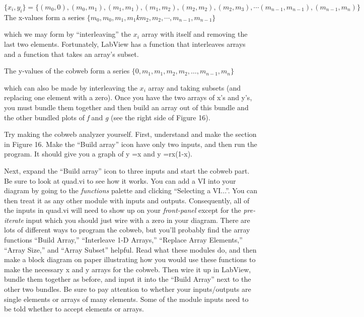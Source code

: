\documentclass{../lab}
\begin{document}
\begin{equation}
    \{x_i,y_i\}=\{(m_0,0),(m_0,m_1),(m_1,m_1),(m_1,m_2),(m_2,m_2),(m_2,m_3),\cdots (m_{n-1},m_{n-1}),(m_{n-1},m_n)\}
\end{equation}
The x-values form a series $ \{m_0,m_0,m_1,m_1km_2,m_2,\cdots,m_{n-1},m_{n-1}\} $

which we may form by ``interleaving'' the $x_i$ array with itself and removing the last two elements. Fortunately, LabView has a function that interleaves arrays and a function that takes an array's subset.

The y-values of the cobweb form a series $ \{0,m_1,m_1,m_2,m_2,\ldots ,m_{n-1},m_n\} $

which can also be made by interleaving the $x_i$ array and taking subsets (and replacing one element with a zero). Once you have the two arrays of x's and y's, you must bundle them together and then build an array out of this bundle and the other bundled plots of \emph{f} and \emph{g} (see the right side of Figure 16).

Try making the cobweb analyzer yourself. First, understand and make the section in Figure 16. Make the ``Build array'' icon have only two inputs, and then run the program. It should give you a graph of y =x and y =rx(1-x).

Next, expand the ``Build array'' icon to three inputs and start the cobweb part. Be sure to look at quad.vi to see how it works. You can add a VI into your diagram by going to the \emph{functions} palette and clicking ``Selecting a VI...''. You can then treat it as any other module with inputs and outputs. Consequently, all of the inputs in quad.vi will need to show up on your \emph{front-panel} except for the \emph{pre-iterate} input which you should just wire with a zero in your diagram. There are lots of different ways to program the cobweb, but you'll probably find the array functions ``Build Array,'' ``Interleave 1-D Arrays,'' ``Replace Array Elements,'' ``Array Size,'' and ``Array Subset'' helpful. Read what these modules do, and then make a block diagram on paper illustrating how you would use these functions to make the necessary x and y arrays for the cobweb. Then wire it up in LabView, bundle them together as before, and input it into the ``Build Array'' next to the other two bundles. Be sure to pay attention to whether your inputs/outputs are single elements or arrays of many elements. Some of the module inputs need to be told whether to accept elements or arrays.
\end{document}
